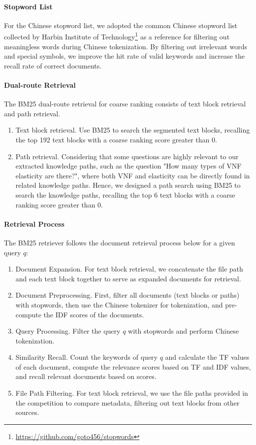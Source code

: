 \documentclass[11pt]{article}
\begin{document}
\paragraph{Stopword List}
For the Chinese stopword list, we adopted the common Chinese stopword list collected by Harbin Institute of Technology\footnote{\href{https://github.com/goto456/stopwords}{https://github.com/goto456/stopwords}} as a reference for filtering out meaningless words during Chinese tokenization. By filtering out irrelevant words and special symbols, we improve the hit rate of valid keywords and increase the recall rate of correct documents.

\paragraph{Dual-route Retrieval}
The BM25 dual-route retrieval for coarse ranking consists of text block retrieval and path retrieval.
\begin{enumerate}
    \item Text block retrieval. Use BM25 to search the segmented text blocks, recalling the top 192 text blocks with a coarse ranking score greater than 0.
    \item Path retrieval. Considering that some questions are highly relevant to our extracted knowledge paths, such as the question "How many types of VNF elasticity are there?", where both VNF and elasticity can be directly found in related knowledge paths. Hence, we designed a path search using BM25 to search the knowledge paths, recalling the top 6 text blocks with a coarse ranking score greater than 0.
\end{enumerate}

\paragraph{Retrieval Process}
The BM25 retriever follows the document retrieval process below for a given query $q$:
\begin{enumerate}
    \item Document Expansion. For text block retrieval, we concatenate the file path and each text block together to serve as expanded documents for retrieval.
    \item Document Preprocessing. First, filter all documents (text blocks or paths) with stopwords, then use the Chinese tokenizer for tokenization, and pre-compute the IDF scores of the documents.
    \item Query Processing. Filter the query $q$ with stopwords and perform Chinese tokenization.
    \item Similarity Recall. Count the keywords of query $q$ and calculate the TF values of each document, compute the relevance scores based on TF and IDF values, and recall relevant documents based on scores.
    \item File Path Filtering. For text block retrieval, we use the file paths provided in the competition to compare metadata, filtering out text blocks from other sources.
\end{enumerate}
\end{document}

